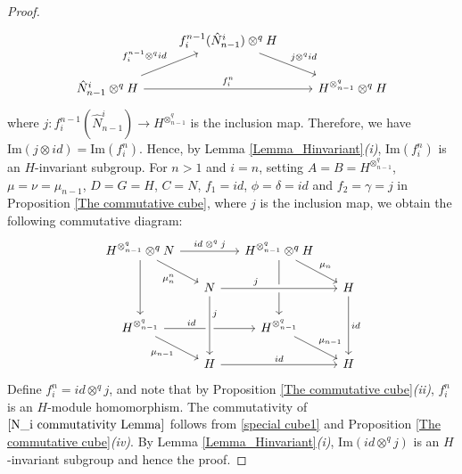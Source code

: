 \documentclass[12pt]{elsarticle}
\newtheorem*{main corollary*}{Main Corollary}
\theoremstyle{definition}
\newcommand{\tens}{
	\otimes^q}
\newcommand{\im}[1]{\text{Im}{(#1)}}
\begin{document}
\begin{proof}
\[
\begin{tikzcd}
 & f_i^{n-1}(\hat{N}^i_{n-1})\tens H \arrow{dr}{j\tens id} \\
\hat{N}^i_{n-1}\tens H \arrow{ur}{f_i^{n-1}\tens id} \arrow{rr}{f_i^{n}} && H^{\otimes^q_{n-1}}\tens H
\end{tikzcd}
\]where $j:f_i^{n-1}(\hat{N}^i_{n-1})\to H^{\otimes^q_{n-1}}$ is the inclusion map. Therefore, we have $\im{j\otimes id}=\im{f_i^n}$. Hence, by Lemma \ref{Lemma_Hinvariant}\textit{(i)}, $\im{f_i^n}$ is an $H$-invariant subgroup. For $n>1$ and $i=n$, setting $A=B=H^{\otimes^q_{n-1}}$, $\mu=\nu=\mu_{n-1}$, $D=G=H$, $C=N$, $f_1=id$, $\phi=\delta=id$ and $f_2=\gamma=j$ in Proposition \ref{The commutative cube}, where $j$ is the inclusion map,  we obtain the following commutative diagram: 
 \begin{equation}\label{special cube1}
   \begin{tikzcd}[row sep=1.5em, column sep = 1.5em]
   H^{\otimes^q_{n-1}}\tens N\arrow[rr,"id\;\tens \;j"] \arrow[dr,swap,"\mu_n^n"] \arrow[dd, swap] &&
  H^{\otimes^q_{n-1}}\tens H \arrow[dd, pos=.3] \arrow[dr,"\mu_n"] \\
   & N \arrow[rr, pos=.3,"j", crossing over] &&
   H \arrow[dd,"id"] \\
 H^{\otimes^q_{n-1}} \arrow[rr,"id",pos=.3] \arrow[dr, swap,"\mu_{n-1}"] && H^{\otimes^q_{n-1}}\arrow[dr,"\mu_{n-1}"] \\        
   & H \arrow[rr,"id"] \arrow[from=uu,"j", pos=.3, crossing over]&& H
    \end{tikzcd}
 \end{equation}Define $f_i^n=id\tens j$, and note that by Proposition \ref{The commutative cube}\textit{(ii)}, $f_i^n$ is an $H$-module homomorphism. The commutativity of $\eqref{N_i commutativity Lemma}$ follows from \eqref{special cube1} and Proposition \ref{The commutative cube}\textit{(iv)}. By Lemma \ref{Lemma_Hinvariant}\textit{(i)}, $\im{id\tens j}$ is an $H$-invariant subgroup and hence the proof.
     
 \end{proof}
\end{document}
